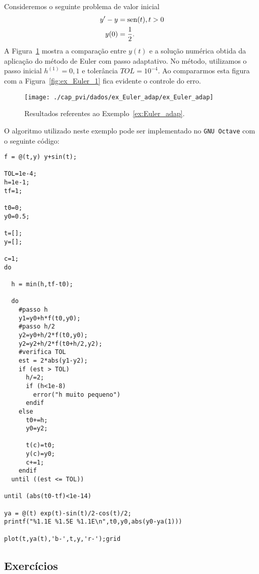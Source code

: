 \begin{ex}\label{ex:Euler_adap}
  Consideremos o seguinte problema de valor inicial
  \begin{align}
    y' - y &= \operatorname{sen}(t), t>0\\
    y(0) &= \frac{1}{2}.
  \end{align}
  A Figura~\ref{fig:ex_Euler_adap} mostra a comparação entre $y(t)$ e a solução numérica obtida da aplicação do método de Euler com passo adaptativo. No método, utilizamos o passo inicial $h^{(1)}=0,1$ e tolerância $TOL=10^{-4}$. Ao compararmos esta figura com a Figura~\eqref{fig:ex_Euler_1} fica evidente o controle do erro.

  \begin{figure}[h!]
    \centering
    \texttt{[image: ./cap\_pvi/dados/ex\_Euler\_adap/ex\_Euler\_adap]}
    \caption{Resultados referentes ao Exemplo~\ref{ex:Euler_adap}.}
    \label{fig:ex_Euler_adap}
  \end{figure}

\ifisoctave
O algoritmo utilizado neste exemplo pode ser implementado no \verb+GNU Octave+ com o seguinte código:
\begin{verbatim}
f = @(t,y) y+sin(t);

TOL=1e-4;
h=1e-1;
tf=1;

t0=0;
y0=0.5;

t=[];
y=[];

c=1;
do

  h = min(h,tf-t0);
 
  do
    #passo h
    y1=y0+h*f(t0,y0);
    #passo h/2
    y2=y0+h/2*f(t0,y0);
    y2=y2+h/2*f(t0+h/2,y2);
    #verifica TOL
    est = 2*abs(y1-y2);
    if (est > TOL)
      h/=2;
      if (h<1e-8)
        error("h muito pequeno")
      endif
    else
      t0+=h;
      y0=y2;
      
      t(c)=t0;
      y(c)=y0;
      c+=1;
    endif
  until ((est <= TOL))
  
until (abs(t0-tf)<1e-14)

ya = @(t) exp(t)-sin(t)/2-cos(t)/2;
printf("%1.1E %1.5E %1.1E\n",t0,y0,abs(y0-ya(1)))

plot(t,ya(t),'b-',t,y,'r-');grid
\end{verbatim}
\fi

\end{ex}

\subsection*{Exercícios}

